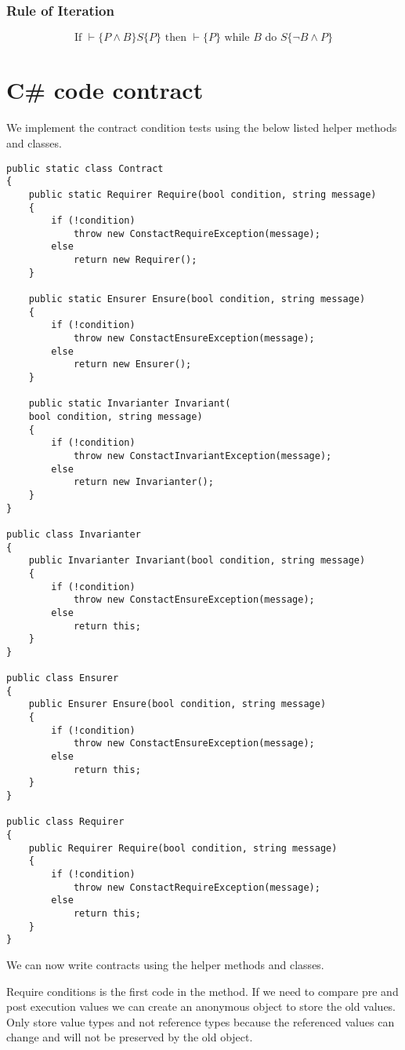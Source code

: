 \subsubsection{Rule of Iteration}
\[
	\textrm{If } \vdash \{P \land B\}S\{P\} \textrm{ then } \vdash \{P\}\textrm{ while } B \textrm{ do } S\{\lnot B \land P\}
\]

\section{C\# code contract}
We implement the contract condition tests using the below listed helper methods 
and classes.

\begin{lstlisting}[frame=single]
public static class Contract
{
    public static Requirer Require(bool condition, string message)
    {
        if (!condition)
            throw new ConstactRequireException(message);
        else
            return new Requirer();
    }

    public static Ensurer Ensure(bool condition, string message)
    {
        if (!condition)
            throw new ConstactEnsureException(message);
        else
            return new Ensurer();
    }

    public static Invarianter Invariant(
	bool condition, string message)
    {
        if (!condition)
            throw new ConstactInvariantException(message);
        else
            return new Invarianter();
    }
}

public class Invarianter
{
    public Invarianter Invariant(bool condition, string message)
    {
        if (!condition)
            throw new ConstactEnsureException(message);
        else
            return this;
    }
}

public class Ensurer
{
    public Ensurer Ensure(bool condition, string message)
    {
        if (!condition)
            throw new ConstactEnsureException(message);
        else
            return this;
    }
}

public class Requirer
{
    public Requirer Require(bool condition, string message)
    {
        if (!condition)
            throw new ConstactRequireException(message);
        else
            return this;
    }
}
\end{lstlisting}

We can now write contracts using the helper methods and classes. 

Require conditions is the first code in the method. If we need to compare pre and 
post execution values we can create an anonymous object to store the old values. 
Only store value types and not reference types because the referenced values can
change and will not be preserved by the old object.

